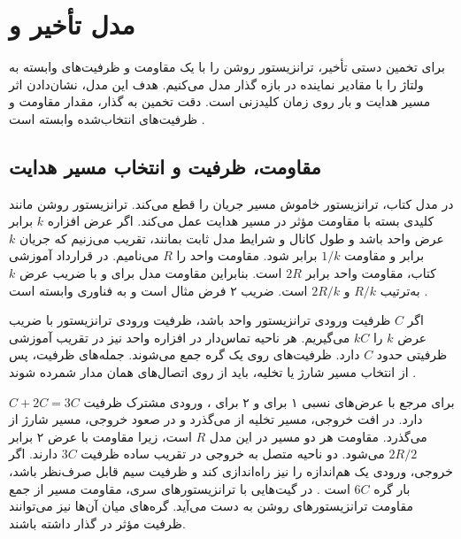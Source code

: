 \section{مدل تأخیر  و }
\label{sec:delay-rc-model}

برای تخمین دستی تأخیر، ترانزیستور روشن را با یک مقاومت و ظرفیت‌های
وابسته به ولتاژ را با مقادیر نماینده در بازه گذار مدل می‌کنیم.
هدف این مدل، نشان‌دادن اثر مسیر هدایت و بار روی زمان کلیدزنی است.
دقت تخمین به گذار، مقدار مقاومت و ظرفیت‌های انتخاب‌شده وابسته است
\cite[بخش ، صفحات ۱۴۶ تا ۱۵۵]{weste}.

\subsection{مقاومت، ظرفیت و انتخاب مسیر هدایت}
\label{sec:delay-rc-sizing}

در مدل کتاب، ترانزیستور خاموش مسیر جریان را قطع می‌کند. ترانزیستور
روشن مانند کلیدی بسته با مقاومت مؤثر در مسیر هدایت عمل می‌کند.
اگر عرض افزاره \(k\) برابر عرض واحد باشد و طول کانال و شرایط مدل
ثابت بمانند، تقریب می‌زنیم که جریان \(k\) برابر و مقاومت \(1/k\)
برابر شود. مقاومت واحد  را \(R\) می‌نامیم. در قرارداد
آموزشی کتاب، مقاومت واحد  برابر \(2R\) است. بنابراین
مقاومت مدل برای  و  با ضریب عرض \(k\)
به‌ترتیب \(R/k\) و \(2R/k\) است. ضریب ۲ فرض مثال است و به فناوری
وابسته است \cite[بخش ، صفحه ۱۴۶]{weste}.

اگر \(C\) ظرفیت ورودی ترانزیستور واحد باشد، ظرفیت ورودی ترانزیستور
با ضریب عرض \(k\) را \(kC\) می‌گیریم. هر ناحیه تماس‌دار
 در افزاره واحد نیز در تقریب آموزشی ظرفیتی حدود
\(C\) دارد. ظرفیت‌های روی یک گره جمع می‌شوند. جمله‌های ظرفیت، پس
از انتخاب مسیر شارژ یا تخلیه، باید از روی اتصال‌های همان مدار شمرده
شوند \cite[بخش‌های  و ، صفحه ۱۴۷]{weste}.

برای  مرجع با عرض‌های نسبی ۱ برای  و ۲
برای ، ورودی مشترک ظرفیت \(C+2C=3C\) دارد. در افت
خروجی، مسیر تخلیه از  می‌گذرد و در صعود خروجی، مسیر
شارژ از  می‌گذرد. مقاومت هر دو مسیر در این مدل \(R\)
است، زیرا مقاومت  با عرض ۲ برابر \(2R/2\) می‌شود.
دو ناحیه  متصل به خروجی در تقریب ساده ظرفیت \(3C\)
دارند. اگر خروجی، ورودی یک  هم‌اندازه را نیز
راه‌اندازی کند و ظرفیت سیم قابل صرف‌نظر باشد، بار گره \(6C\)
است \cite[شکل ، صفحه ۱۴۷]{weste}. در گیت‌هایی
با ترانزیستورهای سری، مقاومت مسیر از جمع مقاومت ترانزیستورهای
روشن به دست می‌آید. گره‌های میان آن‌ها نیز می‌توانند ظرفیت مؤثر
در گذار داشته باشند.

